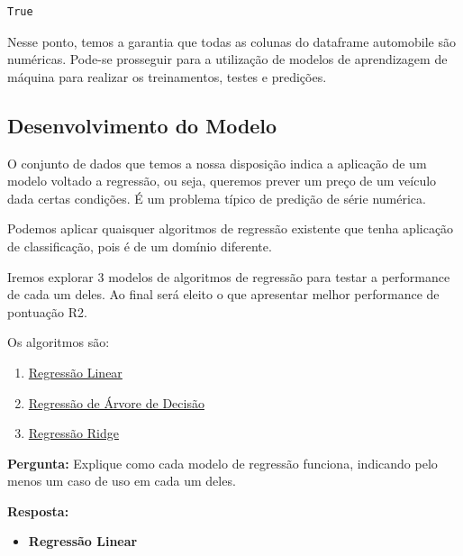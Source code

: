 \documentclass[11pt]{article}
\providecommand{\tightlist}{%
      \setlength{\itemsep}{0pt}\setlength{\parskip}{0pt}}
\begin{document}
    \begin{Verbatim}[commandchars=\\\{\}]
True

    \end{Verbatim}

    Nesse ponto, temos a garantia que todas as colunas do dataframe
automobile são numéricas. Pode-se prosseguir para a utilização de
modelos de aprendizagem de máquina para realizar os treinamentos, testes
e predições.

    \subsection{Desenvolvimento do Modelo}\label{desenvolvimento-do-modelo}

    O conjunto de dados que temos a nossa disposição indica a aplicação de
um modelo voltado a regressão, ou seja, queremos prever um preço de um
veículo dada certas condições. É um problema típico de predição de série
numérica.

Podemos aplicar quaisquer algoritmos de regressão existente que tenha
aplicação de classificação, pois é de um domínio diferente.

Iremos explorar 3 modelos de algoritmos de regressão para testar a
performance de cada um deles. Ao final será eleito o que apresentar
melhor performance de pontuação R2.

Os algoritmos são:

\begin{enumerate}
\def\labelenumi{\arabic{enumi}.}
\tightlist
\item
  \href{http://scikit-learn.org/stable/auto_examples/linear_model/plot_ols.html}{Regressão
  Linear}
\item
  \href{http://scikit-learn.org/stable/modules/generated/sklearn.tree.DecisionTreeRegressor.html}{Regressão
  de Árvore de Decisão}
\item
  \href{http://scikit-learn.org/stable/modules/linear_model.html\#ridge-regression}{Regressão
  Ridge}
\end{enumerate}

    \textbf{Pergunta:} Explique como cada modelo de regressão funciona,
indicando pelo menos um caso de uso em cada um deles.

\textbf{Resposta:}

\begin{itemize}
\tightlist
\item
  \textbf{Regressão Linear}
\end{itemize}
\end{document}
